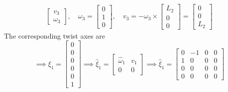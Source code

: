 \begin{align*}
\begin{bmatrix}
        v_3 \\
        \omega_3
    \end{bmatrix},
    \quad
    \omega_3
    =
    \begin{bmatrix}
        0 \\
        1 \\
        0
    \end{bmatrix},
    \quad
    v_3
    =
    - \omega_3 \times
    \begin{bmatrix}
        L_2 \\
        0   \\
        0
    \end{bmatrix}
    =
    \begin{bmatrix}
        0 \\
        0 \\
        L_2
    \end{bmatrix}
\end{align*}
The corresponding twist axes are
\begin{equation*}
    \implies
    \xi_{1}
    =
    \begin{bmatrix}
        0 \\
        0 \\
        0 \\
        0 \\
        0 \\
        1
    \end{bmatrix}
    \implies
    \widehat{\xi}_{1}
    =
    \begin{bmatrix}
        \widehat{\omega}_{1} & v_1 \\
        0                    & 0
    \end{bmatrix}
    \implies
    \boxed{
        \widehat{\xi}_{1}
        =
        \begin{bmatrix}
            0 & -1 & 0 & 0 \\
            1 & 0  & 0 & 0 \\
            0 & 0  & 0 & 0 \\
            0 & 0  & 0 & 0
        \end{bmatrix}
    }
\end{equation*}

